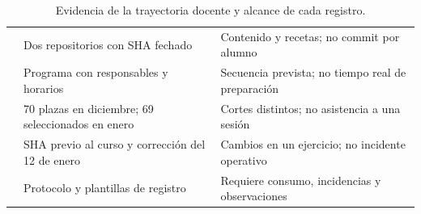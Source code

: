 \begin{table}[tbp]
\caption{Evidencia de la trayectoria docente y alcance de cada registro.}\label{tab:evidencia}
\begin{tabularx}{\linewidth}{@{}>{\RaggedRight\arraybackslash}p{34mm}YY@{}}
\toprule
{} &  &  \\
\midrule
{} & Dos repositorios con SHA fechado & Contenido y recetas; no commit por alumno \\
\addlinespace
{} & Programa con responsables y horarios & Secuencia prevista; no tiempo real de preparación \\
\addlinespace
{} & 70 plazas en diciembre; 69 seleccionados en enero & Cortes distintos; no asistencia a una sesión \\
\addlinespace
{} & SHA previo al curso y corrección del 12 de enero & Cambios en un ejercicio; no incidente operativo \\
\addlinespace
{} & Protocolo y plantillas de registro & Requiere consumo, incidencias y observaciones \\
\bottomrule
\end{tabularx}
\end{table}
